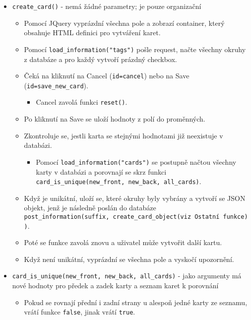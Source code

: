 \documentclass[11pt]{article}
\providecommand{\tightlist}{\setlength{\itemsep}{1pt}\setlength{\parskip}{1pt}}
\let\oldtexttt\texttt
\renewcommand{\texttt}[1]{\oldtexttt{\textcolor{codehighlight}{#1}}}
\begin{document}
\begin{itemize}
\tightlist
\item
  \texttt{create\_card()} - nemá žádné parametry; je pouze organizační

  \begin{itemize}
  \tightlist
  \item
    Pomocí JQuery vyprázdní všechna pole a zobrazí container, který
    obsahuje HTML definici pro vytváření karet.
  \item
    Pomocí \texttt{load\_information("tags")} pošle request, načte
    všechny okruhy z databáze a pro každý vytvoří prázdný checkbox.
  \item
    Čeká na kliknutí na Cancel (\texttt{id=cancel}) nebo na Save
    (\texttt{id=save\_new\_card}).

    \begin{itemize}
    \tightlist
    \item
      Cancel zavolá funkci \texttt{reset()}.
    \end{itemize}
  \item
    Po kliknutí na Save se uloží hodnoty z polí do proměnných.
  \item
    Zkontroluje se, jestli karta se stejnými hodnotami již neexistuje v
    databázi.

    \begin{itemize}
    \tightlist
    \item
      Pomocí \texttt{load\_information("cards")} se postupně načtou
      všechny karty v databázi a porovnají se skrz funkci
      \texttt{card\_is\_unique(new\_front,\ new\_back,\ all\_cards)}.
    \end{itemize}
  \item
    Když je unikátní, uloží se, které okruhy byly vybrány a vytvoří se
    JSON objekt, jenž je následně poslán do databáze
    \texttt{post\_information(suffix,\ create\_card\_object(viz\ Ostatní\ funkce))}.
  \item
    Poté se funkce zavolá znovu a uživatel může vytvořit další kartu.
  \item
    Když není unikátní, vyprázdní se všechna pole a vyskočí upozornění.
  \end{itemize}
\item
  \texttt{card\_is\_unique(new\_front,\ new\_back,\ all\_cards)} - jako
  argumenty má nové hodnoty pro předek a zadek karty a seznam karet k
  porovnání

  \begin{itemize}
  \tightlist
  \item
    Pokud se rovnají přední i zadní strany u alespoň jedné karty ze
    seznamu, vrátí funkce \texttt{false}, jinak vrátí \texttt{true}.
  \end{itemize}
\end{itemize}
\end{document}
